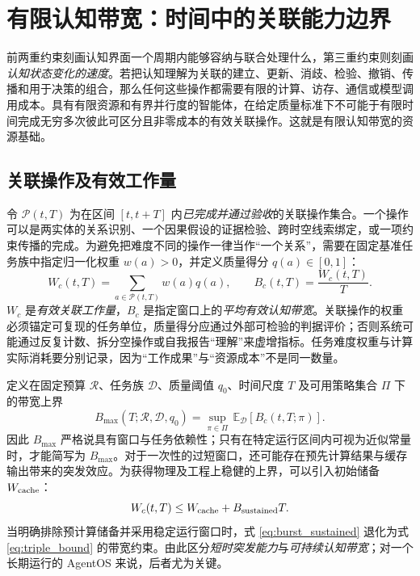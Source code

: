 \section{有限认知带宽：时间中的关联能力边界}
\label{sec:bandwidth}

前两重约束刻画认知界面一个周期内能够容纳与联合处理什么，第三重约束则刻画\emph{认知状态变化的速度}。若把认知理解为关联的建立、更新、消歧、检验、撤销、传播和用于决策的组合，那么任何这些操作都需要有限的计算、访存、通信或模型调用成本。具有有限资源和有界并行度的智能体，在给定质量标准下不可能于有限时间完成无穷多次彼此可区分且非零成本的有效关联操作。这就是有限认知带宽的资源基础。

\subsection*{关联操作及有效工作量}

令 $\mathcal P(t,T)$ 为在区间 $[t,t+T]$ 内\emph{已完成并通过验收}的关联操作集合。一个操作可以是两实体的关系识别、一个因果假设的证据检验、跨时空线索绑定，或一项约束传播的完成。为避免把难度不同的操作一律当作“一个关系”，需要在固定基准任务族中指定归一化权重 $w(a)>0$，并定义质量得分 $q(a)\in[0,1]$：
\begin{equation}
 W_c(t,T)=\sum_{a\in\mathcal P(t,T)}w(a)q(a),
 \qquad
 B_c(t,T)=\frac{W_c(t,T)}{T}.
 \label{eq:cognitive_bandwidth}
\end{equation}
$W_c$ 是\emph{有效关联工作量}，$B_c$ 是指定窗口上的\emph{平均有效认知带宽}。关联操作的权重必须锚定可复现的任务单位，质量得分应通过外部可检验的判据评价；否则系统可能通过反复计数、拆分空操作或自我报告“理解”来虚增指标。任务难度权重与计算实际消耗要分别记录，因为“工作成果”与“资源成本”不是同一数量。

定义在固定预算 $\mathcal R$、任务族 $\mathcal D$、质量阈值 $q_0$、时间尺度 $T$ 及可用策略集合 $\Pi$ 下的带宽上界
\begin{equation}
 B_{\max}(T;\mathcal R,\mathcal D,q_0)
 =\sup_{\pi\in\Pi}\,\mathbb E_{\mathcal D}\!\left[B_c(t,T;\pi)\right].
 \label{eq:bandwidth_sup}
\end{equation}
因此 $B_{\max}$ 严格说具有窗口与任务依赖性；只有在特定运行区间内可视为近似常量时，才能简写为 $B_{\max}$。对于一次性的过短窗口，还可能存在预先计算结果与缓存输出带来的突发效应。为获得物理及工程上稳健的上界，可以引入初始储备 $W_{\rm cache}$：
\begin{equation}
 W_c(t,T)\leq W_{\rm cache}+B_{\rm sustained}T.
 \label{eq:burst_sustained}
\end{equation}
当明确排除预计算储备并采用稳定运行窗口时，式 \eqref{eq:burst_sustained} 退化为式 \eqref{eq:triple_bound} 的带宽约束。由此区分\emph{短时突发能力}与\emph{可持续认知带宽}；对一个长期运行的 AgentOS 来说，后者尤为关键。

